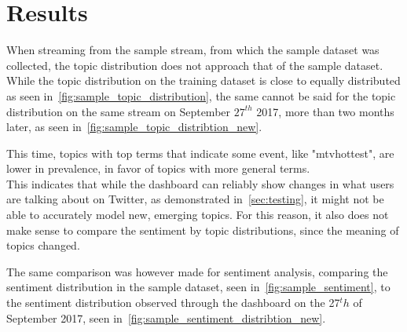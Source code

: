 \chapter{Results}
\label{ch:results}

When streaming from the sample stream, from which the sample dataset was collected,
the topic distribution does not approach that of the sample dataset.
While the topic distribution on the training dataset is close to equally distributed as seen in~\cref{fig:sample_topic_distribution},
the same cannot be said for the topic distribution on the same stream on September $27^{th}$ 2017, more than two months later,
as seen in~\cref{fig:sample_topic_distribtion_new}.

This time, topics with top terms that indicate some event, like "mtvhottest", are lower in prevalence,
in favor of topics with more general terms.\\
This indicates that while the dashboard can reliably show changes in what users are talking about on Twitter,
as demonstrated in~\cref{sec:testing},
it might not be able to accurately model new, emerging topics.
For this reason, it also does not make sense to compare the sentiment by topic distributions,
since the meaning of topics changed.

The same comparison was however made for sentiment analysis, comparing the sentiment distribution in the sample dataset, seen in~\cref{fig:sample_sentiment},
to the sentiment distribution observed through the dashboard on the 27$^th$ of September 2017, seen in~\cref{fig:sample_sentiment_distribtion_new}.

